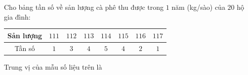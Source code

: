 \begin{ex}
Cho bảng tần số về sản lượng cà phê thu được trong $1$ năm (kg/sào) của $20$ hộ gia đình:
\begin{center}
\begin{tabular}{|c|c|c|c|c|c|c|c|}\hline
Sản lượng & $111$ & $112$ & $113$ & $114$ & $115$ & $116$ & $117$\\\hline
Tần số & $1$ & $3$ & $4$ & $5$ & $4$ & $2$ & $1$\\\hline
\end{tabular}
\end{center}
Trung vị của mẫu số liệu trên là
\end{ex}
